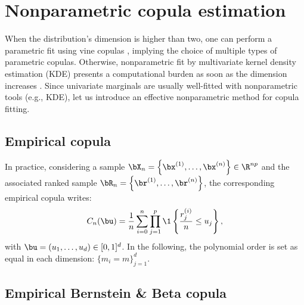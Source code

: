 \cleardoublepage
\chapter{Nonparametric copula estimation}
\label{apx:B}



When the distribution's dimension is higher than two, one can perform a parametric fit using vine copulas \citep{joe2011dependence}, implying the choice of multiple types of parametric copulas. 
Otherwise, nonparametric fit by multivariate kernel density estimation (KDE) presents a computational burden as soon as the dimension increases \citep{chabridon2021global}. 
Since univariate marginals are usually well-fitted with nonparametric tools (e.g., KDE), let us introduce an effective nonparametric method for copula fitting.

\section{Empirical copula}
In practice, considering a sample $\bX_n = \left\{\bx^{(1)}, \dots, \bx^{(n)}\right\} \in \R^{np}$ and the associated ranked sample $\bR_n = \left\{\br^{(1)}, \dots, \br^{(n)}\right\}$, the corresponding empirical copula writes: 
\begin{equation}
    C_n(\bu) = \frac1n \sum_{i=0}^{n} \prod_{j=1}^{p} \1 \left\{ \frac{r_j^{(i)}}{n} \leq u_j \right\},
\end{equation}
with $\bu = (u_1, \dots, u_d) \in [0, 1]^d$. In the following, the polynomial order is set as equal in each dimension: $\{m_i = m\}_{j=1}^d$. 

\section{Empirical Bernstein \& Beta copula}

